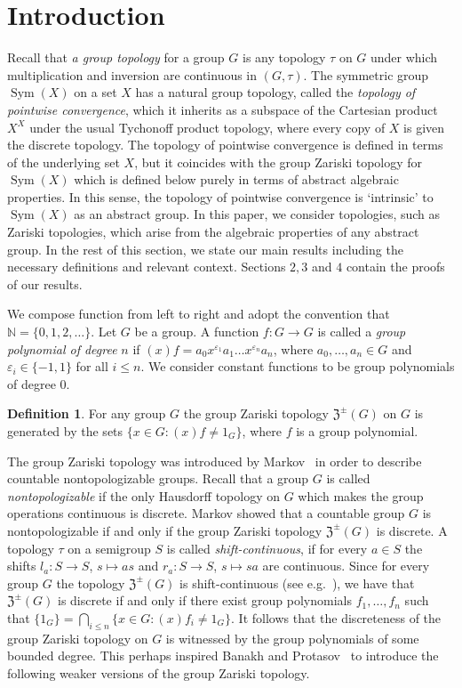 \documentclass[11pt]{amsart}
\theoremstyle{definition}
\newtheorem{definition}[theorem]{Definition}
\newcommand{\N}{\mathbb N}
\newcommand{\Sym}{\operatorname{Sym}}
\begin{document}
\section{Introduction}
Recall that {\em a group topology} for a group $G$ is any topology $\tau$ on $G$ under which multiplication and inversion are continuous in $(G,\tau)$. The symmetric group $\Sym(X)$ on a set $X$ has a natural group topology, called the {\em topology of pointwise convergence}, which it inherits as a subspace of the Cartesian product $X^X$ under the usual Tychonoff product topology, where every copy of $X$ is given the discrete topology. The topology of pointwise convergence is defined in terms of the underlying set $X$, but it coincides with the group Zariski topology for $\Sym(X)$ which is defined below purely in terms of abstract algebraic properties. In this sense, the topology of pointwise convergence is `intrinsic' to $\Sym(X)$ as an abstract group. 
In this paper, we consider topologies, such as Zariski topologies, which arise from the algebraic properties of any abstract group. In the rest of this section, we state our main results including the necessary definitions and relevant context. Sections $2,3$ and $4$ contain the proofs of our results.


We compose function from left to right and adopt the convention that \(\N=\{0, 1, 2, \ldots\}\).
Let $G$ be a group. A function $f: G\rightarrow G$ is called a {\em group polynomial of degree} $n$ if $(x)f=a_0x^{\varepsilon_1}a_1\dots x^{\varepsilon_n}a_n$, where $a_0,\ldots,a_n\in G$ and $\varepsilon_i\in\{-1,1\}$ for all $i\leq n$. We consider constant functions to be group polynomials of degree $0$. 

\begin{definition}
 For any group $G$ the group Zariski topology $\mathfrak{Z}^{\pm}(G)$ on $G$ is generated by the sets $\{x\in G: (x)f\neq 1_G\}$, where $f$ is a group polynomial.   
\end{definition}

The group Zariski topology was introduced by Markov~\cite{Markov} in order to describe countable nontopologizable groups. Recall that a group $G$ is called {\em nontopologizable} if the only Hausdorff topology on $G$ which makes the group operations continuous is discrete. Markov showed that a countable group $G$ is nontopologizable if and only if the group Zariski topology $\mathfrak{Z}^{\pm}(G)$ is discrete. A topology $\tau$ on a semigroup $S$ is called {\em shift-continuous}, if for every $a\in S$ the shifts $l_a: S\rightarrow S$, $s\mapsto as$ and $r_a: S\rightarrow S$, $s\mapsto sa$ are continuous.
Since for every group $G$ the topology $\mathfrak{Z}^{\pm}(G)$ is shift-continuous (see e.g.~\cite{main}), we have that $\mathfrak{Z}^{\pm}(G)$ is discrete if and only if there exist group polynomials $f_1,\ldots,f_n$ such that $\{1_G\}=\bigcap_{i\leq n}\{x\in G: (x)f_i\neq 1_G\}$. It follows that the discreteness of the group Zariski topology on $G$ is witnessed by the group polynomials of some bounded degree. This perhaps inspired Banakh and Protasov~\cite{BT} to introduce the following weaker versions of the group Zariski topology.
 
\end{document}
